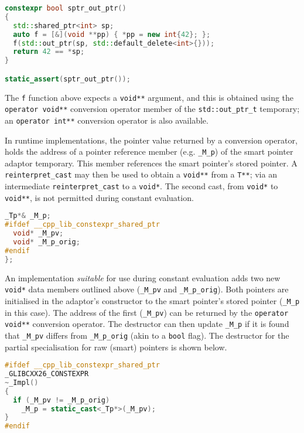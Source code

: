\documentclass[10pt]{article}
\begin{document}
\begin{lstlisting}[language=cpp]
constexpr bool sptr_out_ptr()
{
  std::shared_ptr<int> sp;
  auto f = [&](void **pp) { *pp = new int{42}; };
  f(std::out_ptr(sp, std::default_delete<int>{}));
  return 42 == *sp;
}

static_assert(sptr_out_ptr());
\end{lstlisting}

The \texttt{f} function above expects a \texttt{void**} argument, and this is
obtained using the \texttt{operator void**} conversion operator member of the
\texttt{std::out\_ptr\_t} temporary; an \texttt{operator int**}
conversion operator is also available.

In runtime implementations, the pointer value returned by a conversion
operator, holds the address of a pointer reference member (e.g.
\texttt{\_M\_p}) of the smart pointer adaptor temporary. This member references
the smart pointer's stored pointer. A \texttt{reinterpret\_cast} may then be
used to obtain a \texttt{void**} from a \texttt{T**}; via an intermediate
\texttt{reinterpret\_cast} to a \texttt{void*}. The second cast, from
\texttt{void*} to \texttt{void**}, is not permitted during constant evaluation.

\begin{lstlisting}[language=cpp]
  _Tp*& _M_p;
#ifdef __cpp_lib_constexpr_shared_ptr
  void* _M_pv;
  void* _M_p_orig;
#endif
};
\end{lstlisting}

An implementation \emph{suitable} for use during constant evaluation adds two
new \texttt{void*} data members outlined above (\texttt{\_M\_pv} and
\texttt{\_M\_p\_orig}). Both pointers are initialised in the adaptor's
constructor to the smart pointer's stored pointer (\texttt{\_M\_p} in this
case). The address of the first (\texttt{\_M\_pv}) can be returned by the
\texttt{operator void**} conversion operator. The destructor can then update
\texttt{\_M\_p} if it is found that \texttt{\_M\_pv} differs from
\texttt{\_M\_p\_orig} (akin to a \texttt{bool} flag). The destructor for the
partial specialisation for raw (smart) pointers is shown below.

\begin{lstlisting}[language=cpp]
#ifdef __cpp_lib_constexpr_shared_ptr
_GLIBCXX26_CONSTEXPR
~_Impl()
{
  if (_M_pv != _M_p_orig)
    _M_p = static_cast<_Tp*>(_M_pv);
}
#endif
\end{lstlisting}
\end{document}
